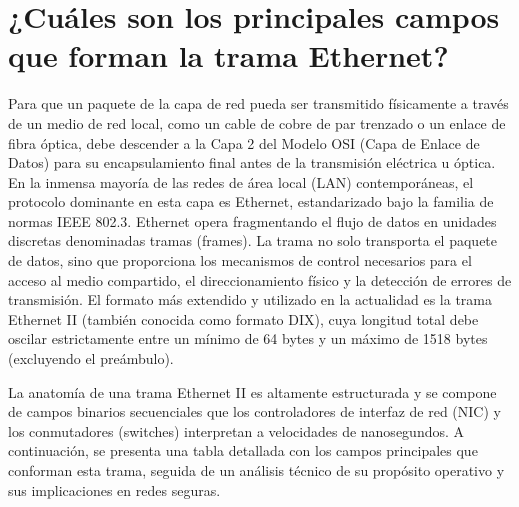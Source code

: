 \documentclass[a4paper,12pt]{article}
\begin{document}
\section{¿Cuáles son los principales campos que forman la trama Ethernet?}

Para que un paquete de la capa de red pueda ser transmitido físicamente a través de un medio de red local, como un cable de cobre de par trenzado o un enlace de fibra óptica, debe descender a la Capa 2 del Modelo OSI (Capa de Enlace de Datos) para su encapsulamiento final antes de la transmisión eléctrica u óptica. En la inmensa mayoría de las redes de área local (LAN) contemporáneas, el protocolo dominante en esta capa es Ethernet, estandarizado bajo la familia de normas IEEE 802.3. Ethernet opera fragmentando el flujo de datos en unidades discretas denominadas tramas (frames). La trama no solo transporta el paquete de datos, sino que proporciona los mecanismos de control necesarios para el acceso al medio compartido, el direccionamiento físico y la detección de errores de transmisión. El formato más extendido y utilizado en la actualidad es la trama Ethernet II (también conocida como formato DIX), cuya longitud total debe oscilar estrictamente entre un mínimo de 64 bytes y un máximo de 1518 bytes (excluyendo el preámbulo).

La anatomía de una trama Ethernet II es altamente estructurada y se compone de campos binarios secuenciales que los controladores de interfaz de red (NIC) y los conmutadores (switches) interpretan a velocidades de nanosegundos. A continuación, se presenta una tabla detallada con los campos principales que conforman esta trama, seguida de un análisis técnico de su propósito operativo y sus implicaciones en redes seguras.
\end{document}
